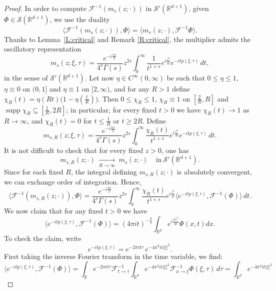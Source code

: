 \documentclass[11pt,letter]{amsart}
\def \RNu {\mathbb{R}^{d+1}}
\newcommand{\Rd}{\mathbb R^d}
\numberwithin{equation}{section}
\numberwithin{equation}{section}
\begin{document}
\begin{proof}
In order to compute $\mathscr F^{-1}(m_s(z;\cdot))$ in $\mathscr S'(\RNu)$, given $\Phi\in\mathscr S(\mathbb R^{d+1})$, we use the duality 
\[
\langle \mathscr F^{-1}(m_s(z;\cdot)),\Phi\rangle
=
\langle m_s(z;\cdot),\mathscr  F^{-1}\Phi\rangle.
\]
Thanks to Lemma~\ref{L:critical} and Remark \ref{R:critical}, the multiplier admits the oscillatory representation
\[
m_s(z;\xi,\tau)
= \frac{e^{-i\frac{\pi s}2}}{4^s\Gamma(s)} z^{2s}
\int_0^\infty
\frac{1}{t^{1+s}}
e^{i \frac{z^2}{4t}}
e^{-i t p(\xi,\tau)}\,dt,
\]
in the sense of $\mathscr S'(\RNu)$.
Let now $\eta\in C^\infty(0,\infty)$ be such that $0\le\eta\le1$, $\eta\equiv0$ on $(0,1]$ and $\eta\equiv1$ on $[2,\infty)$, and for any $R>1$ define $\chi_R(t) = \eta(Rt)\bigl(1-\eta(\frac tR)\bigr)$. Then $0\le\chi_R\le1$, $\chi_R\equiv 1$ on $[\frac2R,R]$ and $\operatorname{supp}\chi_R\subseteq[\frac1R,2R]$; in particular, for every fixed $t>0$ we have $\chi_R(t)\to 1$ as $R\to \infty$, and $\chi_R(t) = 0$ for $t \le \frac{1}{R}$ or $t\ge 2R$. Define
\[
m_{s,R}(z;\xi,\tau)
=
\frac{e^{-i\frac{\pi s}2}}{4^s\Gamma(s)} z^{2s}
\int_0^\infty
\frac{\chi_R(t)}{
t^{1+s}}
e^{i \frac{z^2}{4t}}
e^{-i t p(\xi,\tau)}\,dt.
\]
It is not difficult to check that for every fixed $z>0$,  one has
\[
m_{s,R}(z;\cdot)\ \underset{R\to \infty}{\longrightarrow}\ m_s(z;\cdot)\ \ \ \ \ \text{in}\ \mathscr S'(\RNu).
\]
Since for each fixed $R$, the integral defining $m_{s,R}(z;\cdot)$ is absolutely convergent, we can exchange order of integration. Hence,
\begin{equation}\label{reg-cutoff}
\langle \mathscr F^{-1}(m_{s,R}(z;\cdot)),\Phi\rangle
=
\frac{e^{-i\frac{\pi s}2}}{4^s\Gamma(s)} z^{2s}
\int_0^\infty
\frac{\chi_R(t)}{
t^{1+s}}
e^{i \frac{z^2}{4t}}
\langle e^{-i t p(\xi,\tau)},\mathscr F^{-1}(\Phi)\rangle
\,dt.
\end{equation}
We now claim that for any fixed $t>0$ we have
\begin{equation}\label{beauty}
\langle e^{-i t p(\xi,\tau)},\mathscr F^{-1}(\Phi)\rangle = (4\pi i t)^{-\frac d2} \int_{\Rd} e^{i\frac{|x|^2}{4t}} \Phi(x,t) dx.
\end{equation}
To check the claim, write
\[
e^{-i t p(\xi,\tau)}
=
e^{-2\pi i t\tau}\,e^{-4\pi^2 i t |\xi|^2}.
\]
First taking the inverse Fourier transform in the time variable, we find:
\[
\langle e^{-i t p(\xi,\tau)},\mathscr F^{-1}(\Phi)\rangle = \int_{\mathbb R}
e^{-2\pi i t \tau} \mathscr F^{-1}_{t\to\tau}\int_{\Rd} e^{-4\pi^2 i t |\xi|^2}
\mathscr F^{-1}_{x\to\xi}\Phi(\xi,\tau)\,d\tau
= \int_{\Rd} e^{-4\pi^2 i t |\xi|^2}
\]
\end{proof}
\end{document}
